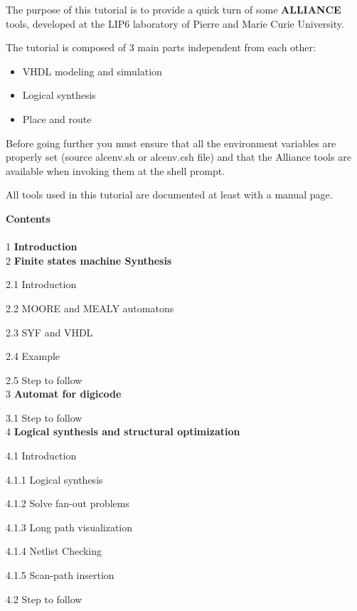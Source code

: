 \documentclass[12pt]{article}
\begin{document}
\newpage
\large{ The purpose of this tutorial is to provide a quick turn of some { \bf
ALLIANCE } tools, developed at the LIP6 laboratory of Pierre and Marie Curie
University.

The tutorial is composed of 3 main parts independent from each other:

\begin{itemize}\itemsep=-.8ex
\item {VHDL modeling and simulation}
\item {Logical synthesis}
\item {Place and route}
\end{itemize}

Before going further you must ensure that all the environment variables are
properly set (source alcenv.sh or alcenv.csh file)
and that the Alliance tools are available when invoking them at the shell
prompt.

All tools used in this tutorial are documented at least with a
manual page.

\newpage
{\bf Contents}\\
\\
 {1} {\bf Introduction}
\\
 {2} {\bf Finite states machine Synthesis}

 {2.1} Introduction

 {2.2} MOORE and MEALY automatons

 {2.3} SYF and VHDL

 {2.4} Example

 {2.5} Step to follow
\\
 {3} {\bf Automat for digicode}

 {3.1} Step to follow
\\
 {4} {\bf Logical synthesis and structural optimization}

 {4.1} Introduction

\hspace{0.5cm} {4.1.1} Logical synthesis

\hspace{0.5cm} {4.1.2} Solve fan-out problems 

\hspace{0.5cm} {4.1.3} Long path visualization 

\hspace{0.5cm} {4.1.4} Netlist Checking

\hspace{0.5cm} {4.1.5} Scan-path insertion

 {4.2} Step to follow

}
\end{document}
